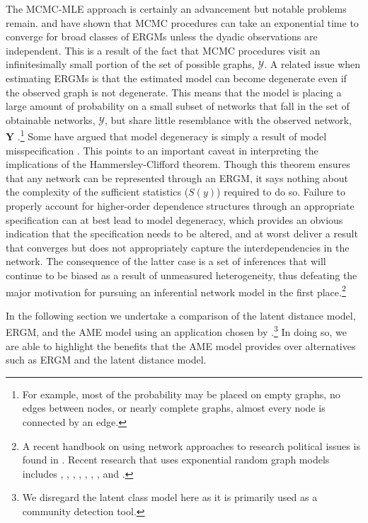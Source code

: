 \documentclass[12pt,pdflatex]{elsarticle}
\begin{document}
The MCMC-MLE approach is certainly an advancement but notable problems remain. \citet{bhamidi:etal:2008} and \citet{chatterjee:diaconis:2013} have shown that MCMC procedures can take an exponential time to converge for broad classes of ERGMs unless the dyadic observations are independent. This is a result of the fact that MCMC procedures visit an infinitesimally small portion of the set of possible graphs, $\mathcal{Y}$. A related issue when estimating ERGMs is that the estimated model can become degenerate even if the observed graph is not degenerate. This means that the model is placing a large amount of probability on a small subset of networks that fall in the set of obtainable networks, $\mathcal{Y}$, but share little resemblance with the observed network, $\mathbf{Y}$ \citep{schweinberger:2011}.\footnote{For example, most of the probability may be placed on empty graphs, no edges between nodes, or nearly complete graphs, almost every node is connected by an edge.} Some have argued that model degeneracy is simply a result of model misspecification \citep{handcock:2003b,goodreau:etal:2008,handcock:etal:2008}. This points to an important caveat in interpreting the implications of the Hammersley-Clifford theorem. Though this theorem ensures that any network can be represented through an ERGM, it says nothing about the complexity of the sufficient statistics ($S(y)$) required to do so. Failure to properly account for higher-order dependence structures through an appropriate specification can at best lead to model degeneracy, which provides an obvious indication that the specification needs to be altered, and at worst deliver a result that converges but does not appropriately capture the interdependencies in the network. The consequence of the latter case is a set of inferences that will continue to be biased as a result of unmeasured heterogeneity, thus defeating the major motivation for pursuing an inferential network model in the first place.\footnote{A recent handbook on using network approaches to research political issues is found in \citet{victor:etal:2016}.  Recent research that uses exponential random graph models includes \citet{victor:ringe:2009}, \citet{berardo:scholz:2010}, \citet{calvo:leiras:2012}, \citet{lubell:etal:2012}, \citet{robbins:etal:2012}, \citet{aleman:calvo:2013}, \citet{heaney:2014}, and \citet{kirkland:williams:2014}.}

In the following section we undertake a comparison of the latent distance model, ERGM, and the AME model using an application chosen by \citet{cranmer:etal:2016}.\footnote{We disregard the latent class model here as it is primarily used as a community detection tool.} In doing so, we are able to highlight the benefits that the AME model provides over alternatives such as ERGM and the latent distance model.
\end{document}
